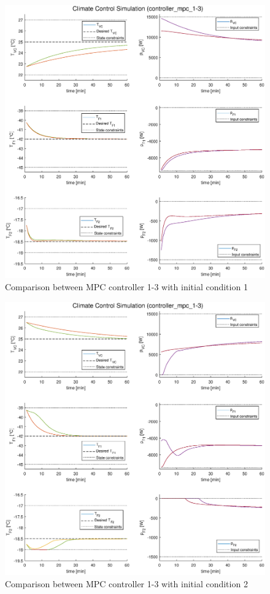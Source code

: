 \documentclass[a4paper,twoside,11pt]{article}
\numberwithin{equation}{section}
\begin{document}
\begin{figure}[ht]
\centering
\includegraphics[scale = 0.58]{image/15-1.eps}
\caption{Comparison between MPC controller 1-3 with initial condition 1}
\label{fig:13}
\end{figure}

\newpage

\begin{figure}[ht]
\centering
\includegraphics[scale = 0.58]{image/15-2.eps}
\caption{Comparison between MPC controller 1-3 with initial condition 2}
\label{fig:14}
\end{figure}
\end{document}
